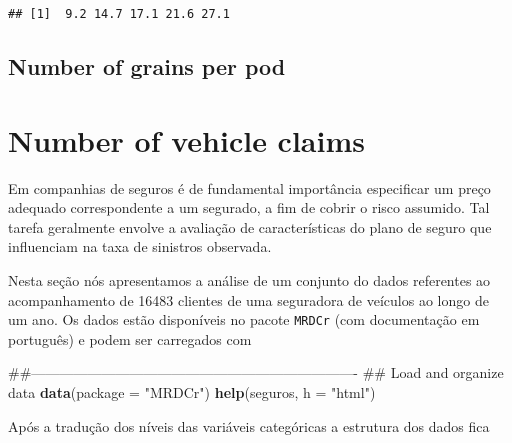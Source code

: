 \documentclass[9pt,a5paper,]{book}
\newenvironment{Shaded}{}{}
\newcommand{\KeywordTok}[1]{\textbf{{#1}}}
\newcommand{\DataTypeTok}[1]{\underline{{#1}}}
\newcommand{\DecValTok}[1]{{#1}}
\newcommand{\StringTok}[1]{{#1}}
\newcommand{\NormalTok}[1]{{#1}}
\renewenvironment{Shaded}{\color{inputcolor}}{}
\renewcommand{\DataTypeTok}[1]{{#1}}
\theoremstyle{definition}
\theoremstyle{definition}
\theoremstyle{remark}
\begin{document}
\begin{Shaded}
\end{Shaded}

\begin{verbatim}
## [1]  9.2 14.7 17.1 21.6 27.1
\end{verbatim}

\subsection{Number of grains per pod}\label{number-of-grains-per-pod}

\section{Number of vehicle claims}\label{number-of-vehicle-claims}

Em companhias de seguros é de fundamental importância especificar um
preço adequado correspondente a um segurado, a fim de cobrir o risco
assumido. Tal tarefa geralmente envolve a avaliação de características
do plano de seguro que influenciam na taxa de sinistros observada.

Nesta seção nós apresentamos a análise de um conjunto do dados
referentes ao acompanhamento de 16483 clientes de uma seguradora de
veículos ao longo de um ano. Os dados estão disponíveis no pacote
\texttt{MRDCr} (com documentação em português) e podem ser carregados
com

\begin{Shaded}
\begin{Highlighting}[]
\NormalTok{##----------------------------------------------------------------------}
\NormalTok{## Load and organize data}
\KeywordTok{data}\NormalTok{(}\DataTypeTok{package =} \StringTok{"MRDCr"}\NormalTok{)}
\KeywordTok{help}\NormalTok{(seguros, }\DataTypeTok{h =} \StringTok{"html"}\NormalTok{)}
\end{Highlighting}
\end{Shaded}

Após a tradução dos níveis das variáveis categóricas a estrutura dos
dados fica

\begin{Shaded}
\end{Shaded}
\end{document}
